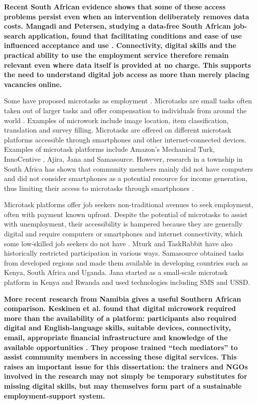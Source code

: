 \textbf{Recent South African evidence shows that some of these access problems persist even when an intervention deliberately removes data costs. Mangadi and Petersen, studying a data-free South African job-search application, found that facilitating conditions and ease of use influenced acceptance and use \cite{mangadi2024}. Connectivity, digital skills and the practical ability to use the employment service therefore remain relevant even where data itself is provided at no charge. This supports the need to understand digital job access as more than merely placing vacancies online.}

Some have proposed microtasks as employment \cite{mtsweni2014,zyskowski2015}. Microtasks are small tasks often taken out of larger tasks and offer compensation to individuals from around the world \cite{mtsweni2014}. Examples of microwork include image location, item classification, translation and survey filling. Microtasks are offered on different microtask platforms accessible through smartphones and other internet-connected devices. Examples of microtask platforms include Amazon’s Mechanical Turk, InnoCentive \cite{innocentive2017}, Ajira, Jana and Samasource. However, research in a township in South Africa has shown that community members mainly did not have computers and did not consider smartphones as a potential resource for income generation, thus limiting their access to microtasks through smartphones \cite{lorini2014}.

Microtask platforms offer job seekers non-traditional avenues to seek employment, often with payment known upfront. Despite the potential of microtasks to assist with unemployment, their accessibility is hampered because they are generally digital and require computers or smartphones and internet connectivity, which some low-skilled job seekers do not have \cite{gupta2012}. Mturk \cite{mturk2018} and TaskRabbit \cite{taskrabbit2013} have also historically restricted participation in various ways. Samasource obtained tasks from developed regions and made them available in developing countries such as Kenya, South Africa and Uganda. Jana started as a small-scale microtask platform in Kenya and Rwanda \cite{eagle2009} and used technologies including SMS and USSD.

\textbf{More recent research from Namibia gives a useful Southern African comparison. Keskinen et al. found that digital microwork required more than the availability of a platform: participants also required digital and English-language skills, suitable devices, connectivity, email, appropriate financial infrastructure and knowledge of the available opportunities \cite{keskinen2022}. They propose trained “tech mediators” to assist community members in accessing these digital services. This raises an important issue for this dissertation: the trainers and NGOs involved in the research may not simply be temporary substitutes for missing digital skills, but may themselves form part of a sustainable employment-support system.}

